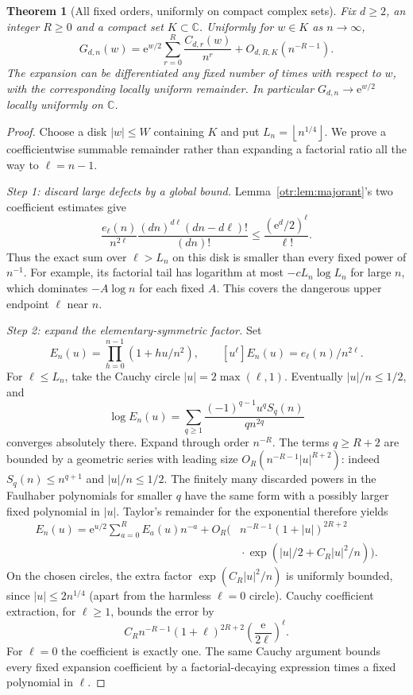 \documentclass[11pt,a4paper]{article}
\newtheorem{theorem}{Theorem}[section]
\theoremstyle{definition}\newtheorem{definition}[theorem]{Definition}
\theoremstyle{remark}\newtheorem{remark}[theorem]{Remark}
\newcommand{\e}{\mathrm e}
\newcommand{\C}{\mathbb C}
\newcommand{\floor}[1]{\left\lfloor #1\right\rfloor}
\begin{document}
\begin{theorem}[All fixed orders, uniformly on compact complex sets]\label{otr:thm:kernel}
Fix $d\ge2$, an integer $R\ge0$ and a compact set $K\subset\C$. Uniformly for $w\in K$ as $n\to\infty$,
\begin{equation}\label{otr:eq:Gexp}
 G_{d,n}(w)=\e^{w/2}\sum_{r=0}^{R}\frac{C_{d,r}(w)}{n^r}
                    +O_{d,R,K}(n^{-R-1}).
\end{equation}
The expansion can be differentiated any fixed number of times with respect to $w$, with the corresponding locally uniform remainder. In particular $G_{d,n}\to\e^{w/2}$ locally uniformly on $\C$.
\end{theorem}
\begin{proof}
Choose a disk $|w|\le W$ containing $K$ and put $L_n=\floor{n^{1/4}}$. We prove a coefficientwise summable remainder rather than expanding a factorial ratio all the way to $\ell=n-1$.

\emph{Step 1: discard large defects by a global bound.}
Lemma~\ref{otr:lem:majorant}'s two coefficient estimates give
\begin{equation}\label{otr:eq:coeffmajorant}
 \frac{e_\ell(n)}{n^{2\ell}}
 \frac{(dn)^{d\ell}(dn-d\ell)!}{(dn)!}
 \le\frac{(\e^d/2)^\ell}{\ell!}.
\end{equation}
Thus the exact sum over $\ell>L_n$ on this disk is smaller than every fixed power of $n^{-1}$. For example, its factorial tail has logarithm at most $-cL_n\log L_n$ for large $n$, which dominates $-A\log n$ for each fixed $A$. This covers the dangerous upper endpoint $\ell$ near $n$.

\emph{Step 2: expand the elementary-symmetric factor.}
Set
\[
 E_n(u)=\prod_{h=0}^{n-1}(1+hu/n^2),\qquad
 [u^\ell]E_n(u)=e_\ell(n)/n^{2\ell}.
\]
For $\ell\le L_n$, take the Cauchy circle $|u|=2\max(\ell,1)$. Eventually $|u|/n\le1/2$, and
\[
 \log E_n(u)=\sum_{q\ge1}\frac{(-1)^{q-1}u^qS_q(n)}{q n^{2q}}
\]
converges absolutely there. Expand through order $n^{-R}$. The terms $q\ge R+2$ are bounded by a geometric series with leading size
$O_R(n^{-R-1}|u|^{R+2})$: indeed $S_q(n)\le n^{q+1}$ and $|u|/n\le1/2$. The finitely many discarded powers in the Faulhaber polynomials for smaller $q$ have the same form with a possibly larger fixed polynomial in $|u|$. Taylor's remainder for the exponential therefore yields
\begin{align}
 E_n(u)=\e^{u/2}\sum_{a=0}^{R}E_a(u)n^{-a}
 +O_R\bigl(&n^{-R-1}(1+|u|)^{2R+2}\nonumber\\
            &{}\cdot\exp(|u|/2+C_R|u|^2/n)\bigr).
 \label{otr:eq:Ecauchy}
\end{align}
On the chosen circles, the extra factor $\exp(C_R|u|^2/n)$ is uniformly bounded, since $|u|\le2n^{1/4}$ (apart from the harmless $\ell=0$ circle). Cauchy coefficient extraction, for $\ell\ge1$, bounds the error by
\begin{equation}\label{otr:eq:Eerror}
 C_R n^{-R-1}(1+\ell)^{2R+2}\left(\frac{\e}{2\ell}\right)^\ell.
\end{equation}
For $\ell=0$ the coefficient is exactly one. The same Cauchy argument bounds every fixed expansion coefficient by a factorial-decaying expression times a fixed polynomial in $\ell$.


\end{proof}
\end{document}
